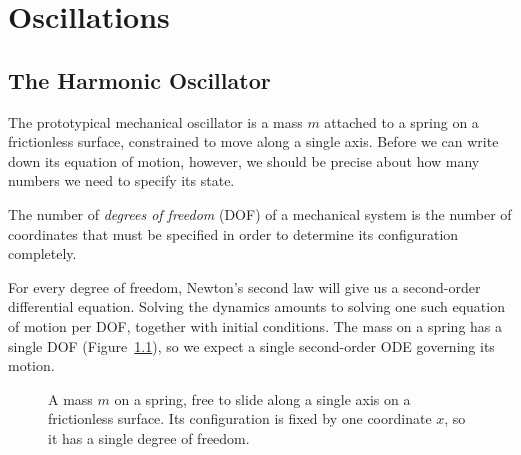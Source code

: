 \chapter{Oscillations}

\section{The Harmonic Oscillator}

The prototypical mechanical oscillator is a mass $m$ attached to a spring on a frictionless surface, constrained to move along a single axis. Before we can write down its equation of motion, however, we should be precise about how many numbers we need to specify its state.

\begin{definition}
The number of \emph{degrees of freedom} (DOF) of a mechanical system is the number of coordinates that must be specified in order to determine its configuration completely.
\end{definition}

For every degree of freedom, Newton's second law will give us a second-order differential equation. Solving the dynamics amounts to solving one such equation of motion per DOF, together with initial conditions. The mass on a spring has a single DOF (Figure~\ref{fig:spring-mass}), so we expect a single second-order ODE governing its motion.

\begin{figure}[ht]
    \centering
    \caption{A mass $m$ on a spring, free to slide along a single axis on a frictionless surface. Its configuration is fixed by one coordinate $x$, so it has a single degree of freedom.}
    \label{fig:spring-mass}
\end{figure}

